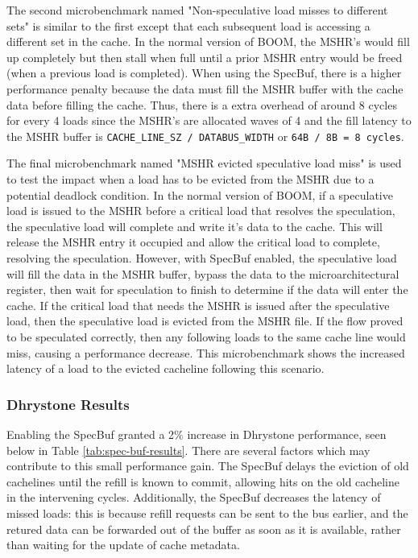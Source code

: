 The second microbenchmark named "Non-speculative load misses to different sets" is similar to the first except that each subsequent
load is accessing a different set in the cache. In the normal version of BOOM, the MSHR's would fill up completely but then stall 
when full until a prior MSHR entry would be freed (when a previous load is completed). When using the SpecBuf, there is a
higher performance penalty because the data must fill the MSHR buffer with the cache data before filling the cache. Thus, there 
is a extra overhead of around 8 cycles for every 4 loads since the MSHR's are allocated waves of 4 and the fill latency to the MSHR
buffer is {\tt CACHE\_LINE\_SZ / DATABUS\_WIDTH} or {\tt 64B / 8B = 8 cycles}.

The final microbenchmark named "MSHR evicted speculative load miss" is used to test the impact when a load has to be evicted from the 
MSHR due to a potential deadlock condition. In the normal version of BOOM, if a speculative load is issued to the 
MSHR before a critical load that resolves the speculation, the speculative load will complete and
write it's data to the cache. This will release the MSHR entry it occupied and allow the critical load to complete, resolving the speculation. 
However, with SpecBuf enabled, the speculative load will fill the data in the MSHR buffer, bypass the data to the microarchitectural register, 
then wait for speculation to finish to determine if the data will enter the cache. If the critical load that needs the MSHR is issued after the speculative load,
then the speculative load is evicted from the MSHR file. If the 
flow proved to be speculated correctly, then any following loads to the same cache line would miss, causing a performance decrease.
This microbenchmark shows the increased latency of a load to the evicted cacheline following this scenario.

\subsubsection{Dhrystone Results}
Enabling the SpecBuf granted a 2\% increase in Dhrystone performance, seen below in Table \ref{tab:spec-buf-results}. There are several factors which may contribute to this small performance gain. The SpecBuf delays the eviction of old cachelines until the refill is known to commit, allowing hits on the old cacheline in the intervening cycles. Additionally, the SpecBuf decreases the latency of missed loads: this is because refill requests can be sent to the bus earlier, and the retured data can be forwarded out of the buffer as soon as it is available, rather than waiting for the update of cache metadata.

